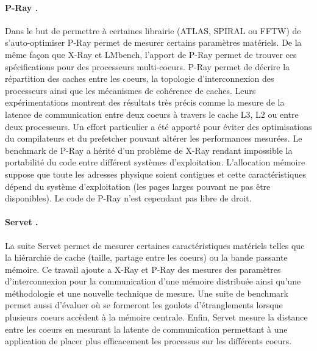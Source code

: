 \paragraph{P-Ray \cite{Duchateau2008}.} Dans le but de permettre à certaines librairie (ATLAS, SPIRAL ou FFTW) de s'auto-optimiser P-Ray permet de mesurer certains paramètres matériels. De la même façon que X-Ray et LMbench, l'apport de P-Ray permet de trouver ces spécifications pour des processeurs multi-coeurs. P-Ray permet de décrire la répartition des caches entre les coeurs, la topologie d'interconnexion des processeurs ainsi que les mécanismes de cohérence de caches. Leurs expérimentations montrent des résultats très précis comme la mesure de la latence de communication entre deux coeurs à travers le cache L3, L2 ou entre deux processeurs. Un effort particulier a été apporté pour éviter des optimisations du compilateurs et du prefetcher pouvant altérer les performances mesurées. Le benchmark de P-Ray a hérité d'un problème de X-Ray rendant impossible la portabilité du code entre différent systèmes d'exploitation. L'allocation mémoire suppose que toute les adresses physique soient contigues et cette caractéristiques dépend du système d'exploitation (les pages larges pouvant ne pas être disponibles).
Le code de P-Ray n'est cependant pas libre de droit.

\paragraph{Servet \cite{gonzalez2010servet}.} La suite Servet permet de mesurer certaines caractéristiques matériels telles que la hiérarchie de cache (taille, partage entre les coeurs) ou la bande passante mémoire. Ce travail ajoute a X-Ray et P-Ray des mesures des paramètres d'interconnexion pour la communication d'une mémoire distribuée ainsi qu'une méthodologie et une nouvelle technique de mesure. Une suite de benchmark permet aussi d'évaluer où se formeront les goulots d'étranglements lorsque plusieurs coeurs accèdent à la mémoire centrale. Enfin, Servet mesure la distance entre les coeurs en mesurant la latente de communication permettant à une application de placer plus efficacement les processus sur les différents coeurs.











~\\

